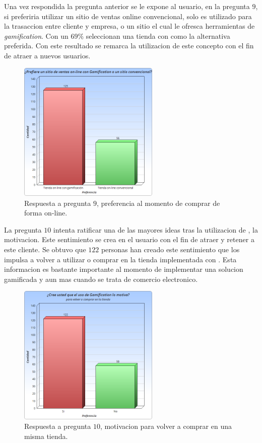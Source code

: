 Una vez respondida la pregunta anterior se le expone al usuario, en la pregunta $9$, si preferiria
utilizar un sitio de ventas online convencional, solo es utilizado para la trasaccion entre cliente
y empresa, o un sitio el cual le ofresca herramientas de \emph{gamification}. Con un $69\%$ seleccionan
una tienda con {\GAM} como la alternativa preferida. Con este resultado se remarca la
utilizacion de este concepto con el fin de atraer a nuevos usuarios.

\begin{figure}[!htb]
  \centering
  \includegraphics[width=0.6\textwidth]{images/Graficos/graf_5_10.png}
  \caption[chart5.10]{Respuesta a pregunta $9$, preferencia al momento de comprar de forma on-line.}
  \label{fig:chart5.10}
\end{figure}


La pregunta $10$ intenta ratificar una de las mayores ideas tras la utilizacion de {\GAM},
la motivacion. Este sentimiento se crea en el usuario con el fin de atraer y retener a este cliente.
 Se obtuvo que $122$ personas han creado este sentimiento que los impulsa a volver a utilizar o comprar 
en la tienda implementada con {\GAM}. Esta informacion es bastante importante al momento de implementar
una solucion gamificada y aun mas cuando se trata de comercio electronico.

\begin{figure}[!htb]
  \centering
  \includegraphics[width=0.6\textwidth]{images/Graficos/graf_5_11.png}
  \caption[chart5.11]{Respuesta a pregunta $10$, motivacion para volver a comprar en una misma tienda.}
  \label{fig:chart5.11}
\end{figure}

